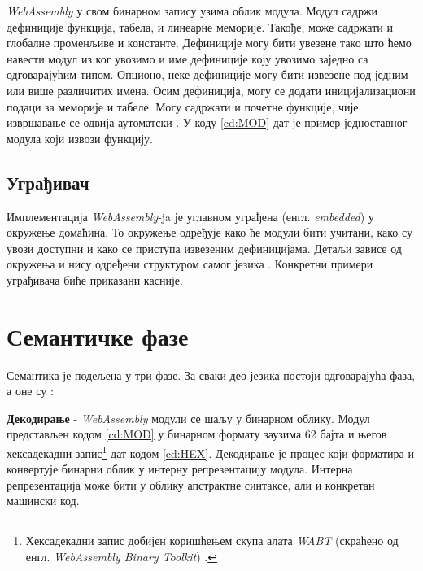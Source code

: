 \documentclass[12pt,oneside]{memoir}
\begin{document}
\textit{WebAssembly} у свом бинарном запису узима облик модула. Модул садржи дефиниције функција, табела, и линеарне
меморије. Такође, може садржати и глобалне променљиве и константе. Дефиниције могу бити увезене тако што ћемо
навести модул из ког увозимо и име дефиниције коју увозимо заједно са одговарајућим типом. Опционо, неке дефиниције
могу бити извезене под једним или више различитих имена. Осим дефиниција, могу се додати иницијализациони подаци за
меморије и табеле. Могу садржати и почетне функције, чије извршавање се одвија аутоматски \cite{WASMS}. У коду
\ref{cd:MOD} дат је пример једноставног модула који извози функцију.


\subsection{Уграђивач}

Имплементација \textit{WebAssembly}-ja је углавном уграђена (енгл. \textit{embedded}) у окружење домаћина. То
окружење одређује како ће модули бити учитани, како су увози доступни и како се приступа извезеним дефиницијама.
Детаљи зависе од окружења и нису одређени структуром самог језика \cite{WASMS}. Конкретни примери уграђивача биће
приказани касније.

\section{Семантичке фазе} \label{chp:PHASES}

Семантика је подељена у три фазе. За сваки део језика постоји одговарајућа фаза, а оне су \cite{WASMS}:

\textbf{Декодирање} - \textit{WebAssembly} модули се шаљу у бинарном облику. Модул представљен кодом \ref{cd:MOD}
у бинарном формату заузима 62 бајта и његов хексадекадни запис\footnote{Хексадекадни запис добијен коришћењем скупа
алата \textit{WABT} (скраћено од енгл. \textit{WebAssembly Binary Toolkit}) \cite{WABT}.} дат кодом \ref{cd:HEX}.
Декодирање је процес који форматира и конвертује бинарни облик у интерну репрезентацију модула. Интерна
репрезентација може бити у облику апстрактне синтаксе, али и конкретан машински код.
\end{document}
